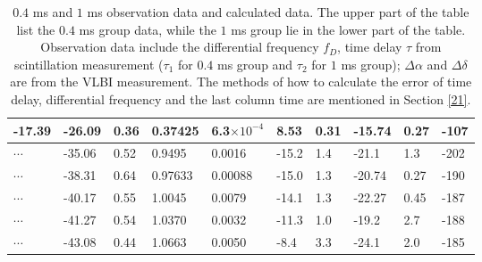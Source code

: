 \documentclass[useAMS,usenatbib]{mn2e}
\providecommand{\e}[1]{\ensuremath{\times 10^{#1}}}
\begin{document}
\begin{table}
\begin{tabular}{llllllllll}
-17.39   &-26.09                            & 0.36      & 0.37425 & 6.3\e{-4}         & 8.53    & 0.31                                     & -15.74    & 0.27      &-107                               
\\ \hline
$\cdots$&         -35.06                           & 0.52                               & 0.9495               & 0.0016                              & -15.2  & 1.4                                     & -21.1   & 1.3   &-202                                   \\
$\cdots$ & -38.31                           & 0.64                               & 0.97633              & 0.00088                             & -15.0  & 1.3                                    & -20.74   & 0.27  &-190                                    \\
$\cdots$ & -40.17                           & 0.55                               & 1.0045              & 0.0079                             & -14.1  & 1.3                                    & -22.27   & 0.45  &-187                                   \\

$\cdots$ & -41.27                           & 0.54                               & 1.0370              & 0.0032                              & -11.3  & 1.0                                     & -19.2   & 2.7   &-188                                   \\

$ \cdots$ & -43.08                           & 0.44                               & 1.0663              & 0.0050                              & -8.4   & 3.3                                      & -24.1   & 2.0   &-185   \\
 \hline                                 
\end{tabular}
\caption{ $0.4$ ms and $1$ ms observation data and calculated data. 
The upper part of the table list the $0.4$ ms group data, while the $1$ ms group lie in the lower part of the table. 
Observation data include the differential frequency $f_D$, time delay $\tau$ from scintillation measurement ($\tau_1$ for $0.4$ ms group and $\tau_2$ for $1$ ms group); $\Delta\alpha$ and $\Delta\delta$ are from the VLBI measurement. The methods of how to calculate the error of time delay, differential frequency and the last column time are mentioned in Section \ref{21}.}
\label{table:apex}
\end{table}
\end{document}
